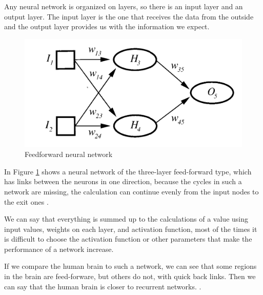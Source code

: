 Any neural network is organized on layers, so there is an input layer and an output layer.
The input layer is the one that receives the data from the outside and 
the output layer provides us with the information we expect. \cite{book.neuronal.network.1995}

\begin{figure}[htbp]
	\centerline{\includegraphics[scale=0.75]{fig/neuronal-network.png}}  
  \caption{Feedforward neural network  \cite{book.neuronal.network.1995}}
  \label{fig:feedforward}
\end{figure}

In Figure \ref{fig:feedforward} shows a neural network of the three-layer feed-forward type, which has links between the neurons in one direction,
because the cycles in such a network are missing, 
the calculation can continue evenly from the input nodes to the exit ones \cite{book.neuronal.network.1995}.

We can say that everything is summed up to the calculations of a value using input values, weights on each layer,
and activation function, most of the times it is difficult to choose the activation function or other parameters that make the performance of a network increase.

If we compare the human brain to such a network, we can see that some regions in the brain are feed-forware, but others do not, with quick back links. 
Then we can say that the human brain is closer to recurrent networks. \cite{book.neuronal.network.1995}.

